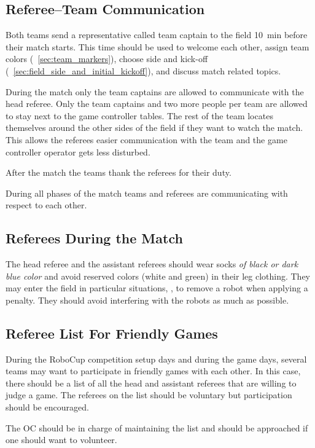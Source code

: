 \subsection{Referee--Team Communication}
\label{sec:referee_team_communication}

Both teams send a representative called team captain to the field \qty{10}{\minute} before their match starts.
This time should be used to welcome each other, assign team colors (\cf~\cref{sec:team_markers}), choose side and kick-off (\cf~\cref{sec:field_side_and_initial_kickoff}), and discuss match related topics.

During the match only the team captains are allowed to communicate with the head referee.
Only the team captains and two more people per team are allowed to stay next to the game controller tables.
The rest of the team locates themselves around the other sides of the field if they want to watch the match.
This allows the referees easier communication with the team and the game controller operator gets less disturbed.

After the match the teams thank the referees for their duty.

During all phases of the match teams and referees are communicating with respect to each other.

\subsection{Referees During the Match}
\label{sec:referee_during_match}

The head referee and the assistant referees should wear socks \emph{of black or dark blue color} and avoid reserved colors (white and green) in their leg clothing.
They may enter the field in particular situations, \eg, to remove a robot when applying a penalty.
They should avoid interfering with the robots as much as possible.

\subsection{Referee List For Friendly Games}
\label{sec:referee_list}

During the RoboCup competition setup days and during the game days, several teams may want to participate in friendly games with each other.
In this case, there should be a list of all the head and assistant referees that are willing to judge a game.
The referees on the list should be voluntary but participation should be encouraged.

The OC should be in charge of maintaining the list and should be approached if one should want to volunteer.